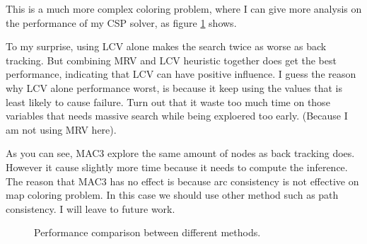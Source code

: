 \documentclass{article}
\begin{document}
This is a much more complex coloring problem, where I can give more analysis on the performance of my CSP solver, as figure \ref{mapcoloring} shows. 

To my surprise, using LCV alone makes the search twice as worse as back tracking. But combining MRV and LCV heuristic together does get the best performance, indicating that LCV can have positive influence. I guess the reason why LCV alone performance worst, is because it keep using the values that is least likely to cause failure. Turn out that it waste too much time on those variables that needs massive search while being exploered too early. (Because I am not using MRV here).

As you can see, MAC3 explore the same amount of nodes as back tracking does. However it cause slightly more time because it needs to compute the inference. The reason that MAC3 has no effect is because arc consistency is not effective on map coloring problem. In this case we should use other method such as path consistency. I will leave to future work.

\begin{figure}[!h]
\normalsize
\centering
{}
\caption{Performance comparison between different methods.}
\label{mapcoloring} %
\end{figure}
\end{document}
